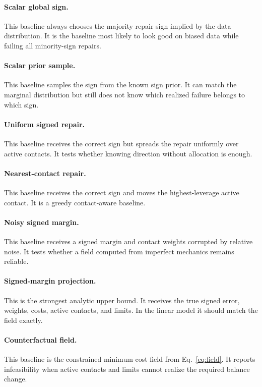 \documentclass{article}
\begin{document}
\paragraph{Scalar global sign.}
This baseline always chooses the majority repair sign implied by the data distribution. It is the baseline most likely to look good on biased data while failing all minority-sign repairs.

\paragraph{Scalar prior sample.}
This baseline samples the sign from the known sign prior. It can match the marginal distribution but still does not know which realized failure belongs to which sign.

\paragraph{Uniform signed repair.}
This baseline receives the correct sign but spreads the repair uniformly over active contacts. It tests whether knowing direction without allocation is enough.

\paragraph{Nearest-contact repair.}
This baseline receives the correct sign and moves the highest-leverage active contact. It is a greedy contact-aware baseline.

\paragraph{Noisy signed margin.}
This baseline receives a signed margin and contact weights corrupted by relative noise. It tests whether a field computed from imperfect mechanics remains reliable.

\paragraph{Signed-margin projection.}
This is the strongest analytic upper bound. It receives the true signed error, weights, costs, active contacts, and limits. In the linear model it should match the field exactly.

\paragraph{Counterfactual field.}
This baseline is the constrained minimum-cost field from Eq.~\ref{eq:field}. It reports infeasibility when active contacts and limits cannot realize the required balance change.
\end{document}
